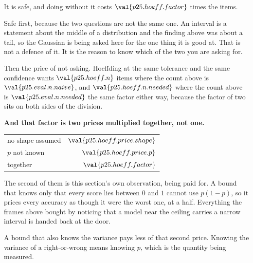 \begin{fr}
\begin{ansblock}
It is safe, and doing without it costs $\val{p25.hoeff.factor}$ times the
items.
\end{ansblock}

Safe first, because the two questions are not the same one. An interval is a
statement about the middle of a distribution and the finding above was about a
tail, so the Gaussian is being asked here for the one thing it is good at. That is not a defence of it. It is the reason to know which of the
two you are asking for.

Then the price of not asking. Hoeffding at the same tolerance and the same
confidence wants $\val{p25.hoeff.n}$ items where the count above is
$\val{p25.eval.n.naive}$, and $\val{p25.hoeff.n.needed}$ where the count above
is $\val{p25.eval.n.needed}$ \dash{} the same factor either way, because the
factor of two sits on both sides of the division.

\textbf{And that factor is two prices multiplied together, not one.}

\begin{center}
\begin{tabular}{lr}
\toprule
no shape assumed & $\val{p25.hoeff.price.shape}$ \\
$p$ not known & $\val{p25.hoeff.price.p}$ \\
\midrule
together & $\val{p25.hoeff.factor}$ \\
\bottomrule
\end{tabular}
\end{center}

The second of them is this section's own observation, being paid for. A bound
that knows only that every score lies between $0$ and $1$ cannot use $p(1-p)$,
so it prices every accuracy as though it were the worst one, at a half.
Everything the frames above bought by noticing that a model near the ceiling
carries a narrow interval is handed back at the door.

A bound that also knows the variance pays less of that second price. Knowing
the variance of a right-or-wrong means knowing $p$, which is the quantity
being measured.
\end{fr}

